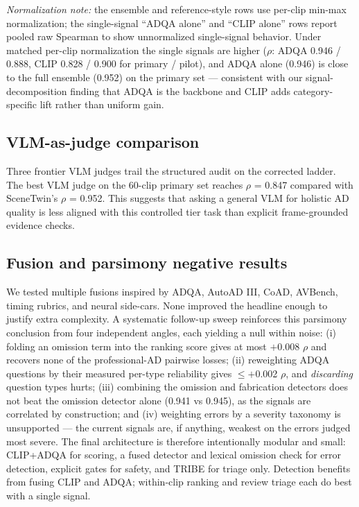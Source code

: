 \documentclass[10pt,twocolumn]{article}
\begin{document}
\textit{Normalization note:} the ensemble and reference-style rows use per-clip min-max normalization; the single-signal ``ADQA alone'' and ``CLIP alone'' rows report pooled raw Spearman to show unnormalized single-signal behavior. Under matched per-clip normalization the single signals are higher ($\rho$: ADQA 0.946 / 0.888, CLIP 0.828 / 0.900 for primary / pilot), and ADQA alone (0.946) is close to the full ensemble (0.952) on the primary set --- consistent with our signal-decomposition finding that ADQA is the backbone and CLIP adds category-specific lift rather than uniform gain.


\subsection{VLM-as-judge comparison}

Three frontier VLM judges trail the structured audit on the corrected ladder. The best VLM judge on the 60-clip primary set reaches $\rho$ = 0.847 compared with SceneTwin's $\rho$ = 0.952. This suggests that asking a general VLM for holistic AD quality is less aligned with this controlled tier task than explicit frame-grounded evidence checks.


\subsection{Fusion and parsimony negative results}

We tested multiple fusions inspired by ADQA, AutoAD III, CoAD, AVBench, timing rubrics, and neural side-cars. None improved the headline enough to justify extra complexity. A systematic follow-up sweep reinforces this parsimony conclusion from four independent angles, each yielding a null within noise: (i) folding an omission term into the ranking score gives at most $+$0.008 $\rho$ and recovers none of the professional-AD pairwise losses; (ii) reweighting ADQA questions by their measured per-type reliability gives $\le +$0.002 $\rho$, and \emph{discarding} question types hurts; (iii) combining the omission and fabrication detectors does not beat the omission detector alone (0.941 vs 0.945), as the signals are correlated by construction; and (iv) weighting errors by a severity taxonomy is unsupported --- the current signals are, if anything, weakest on the errors judged most severe. The final architecture is therefore intentionally modular and small: CLIP+ADQA for scoring, a fused detector and lexical omission check for error detection, explicit gates for safety, and TRIBE for triage only. Detection benefits from fusing CLIP and ADQA; within-clip ranking and review triage each do best with a single signal.
\end{document}
